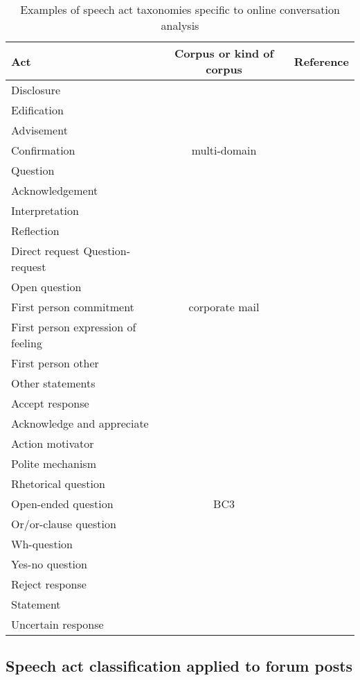 \documentclass[11pt]{article}
\begin{document}
\begin{table}
	\begin{tabularx}{\textwidth}{Y c c}
		\toprule
		Act & Corpus or kind of corpus & Reference \\
		\midrule
		Disclosure &  & \\
		Edification &  & \\
		Advisement &  & \\
		Confirmation & multi-domain & \cite{Lampert_classifyingspeech} \\
		Question &  & \\
		Acknowledgement &  & \\
		Interpretation &  & \\
		Reflection &  & \\
		\midrule
		Direct request
		Question-request &  & \\
		Open question &  & \\
		First person commitment & corporate mail & \cite{de2013classification} \\
		First person expression of feeling &  & \\
		First person other &  & \\
		Other statements &  & \\
		\midrule
		Accept response &  & \\
		Acknowledge and appreciate &  & \\
		Action motivator &  & \\
		Polite mechanism &  & \\
		Rhetorical question &  & \\
		Open-ended question & BC3 & \cite{JanAAAI08} \\
		Or/or-clause question &  & \\
		Wh-question &  & \\
		Yes-no question &  & \\
		Reject response &  & \\
		Statement &  & \\
		Uncertain response &  & \\
		\bottomrule
	\end{tabularx}
	\caption{Examples of speech act taxonomies specific to online conversation analysis}
	\label{fig:emailTaxonomies}
\end{table}

\subsection{Speech act classification applied to forum posts}
\end{document}
